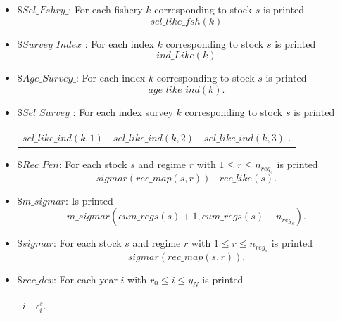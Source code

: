 \documentclass{article}
\begin{document}
\begin{itemize}
\item $\$ Sel\_Fshry\_$: For each fishery $k$ corresponding to stock $s$ is printed
\begin{equation}
    sel\_like\_fsh(k)
\end{equation}

\item $\$ Survey\_Index\_$: For each index $k$ corresponding to stock $s$ is printed
\begin{equation}
    ind\_Like(k)
\end{equation}

\item $\$ Age\_Survey\_$: For each index $k$ corresponding to stock $s$ is printed
\begin{equation}
    age\_like\_ind(k).
\end{equation}

\item $\$ Sel\_Survey\_$: For each index survey $k$ corresponding to stock $s$ is printed
\begin{center}
    \begin{tabular}{c c c }
        $sel\_like\_ind(k,1)$ & $sel\_like\_ind(k,2)$ & $sel\_like\_ind(k,3)$ . \\
         \end{tabular}
\end{center}

\item $\$ Rec\_Pen$: For each stock $s$ and regime $r$ with $1\leq r \leq n_{reg_s}$ is printed
\begin{equation}
    sigmar(rec\_map(s,r)) \ \ \ \ rec\_like(s).
\end{equation}

     
\item $\$ m\_sigmar$: Is printed
\begin{equation}
m\_sigmar(cum\_regs(s)+1,cum\_regs(s)+n_{reg_s}).
\end{equation}

\item $\$ sigmar$: For each stock $s$ and regime $r$ with $1\leq r \leq n_{reg_s}$ is printed
\begin{equation}
    sigmar(rec\_map(s,r)).
\end{equation}

 \item $\$ rec\_dev$: For each year $i$ with $r_0 \leq i \leq y_N$ is printed
 \begin{center}
     \begin{tabular}{c c}
         $i$ & $\epsilon^s_i$. \\
          

\end{tabular}
\end{center}
\end{itemize}
\end{document}
